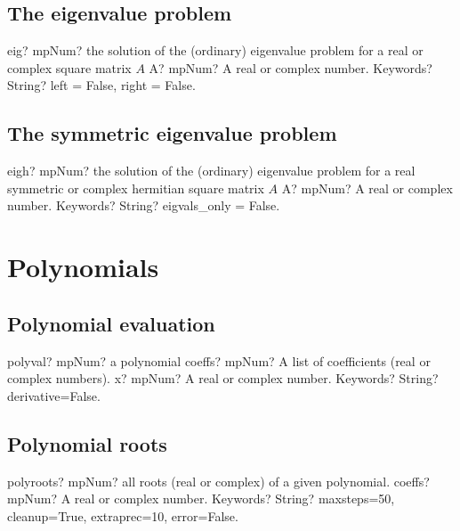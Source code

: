 \documentclass[12pt,a4paper,openany]{book}
\begin{document}
\section{The eigenvalue problem}

\begin{mpFunctionsExtract}
\mpFunctionTwo
{eig? mpNum? the solution of the (ordinary) eigenvalue problem for a real or complex square matrix $A$}
{A? mpNum? A real or complex number.}
{Keywords? String? left = False, right = False.}
\end{mpFunctionsExtract}

\section{The symmetric eigenvalue problem}

\begin{mpFunctionsExtract}
\mpFunctionTwo
{eigh? mpNum? the solution of the (ordinary) eigenvalue problem for a real symmetric or complex hermitian square matrix $A$}
{A? mpNum? A real or complex number.}
{Keywords? String? eigvals\_only = False.}
\end{mpFunctionsExtract}

\chapter{Polynomials}

\section{Polynomial evaluation}

\begin{mpFunctionsExtract}
\mpFunctionThree
{polyval? mpNum? a polynomial }
{coeffs? mpNum? A list of coefficients (real or complex numbers).}
{x? mpNum? A real or complex number.}
{Keywords? String? derivative=False.}
\end{mpFunctionsExtract}

\section{Polynomial roots}

\begin{mpFunctionsExtract}
\mpFunctionTwo
{polyroots? mpNum? all roots (real or complex) of a given polynomial.}
{coeffs? mpNum? A real or complex number.}
{Keywords? String? maxsteps=50, cleanup=True, extraprec=10, error=False.}
\end{mpFunctionsExtract}
\end{document}
